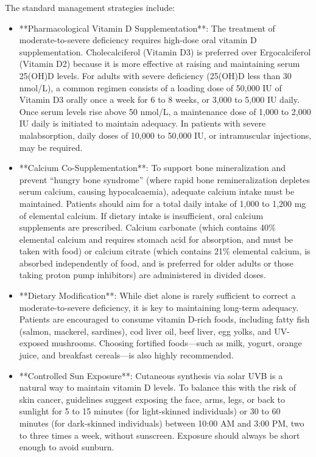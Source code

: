The standard management strategies include:
\begin{itemize}
    \item **Pharmacological Vitamin D Supplementation**: The treatment of moderate-to-severe deficiency requires high-dose oral vitamin D supplementation. Cholecalciferol (Vitamin D3) is preferred over Ergocalciferol (Vitamin D2) because it is more effective at raising and maintaining serum 25(OH)D levels. For adults with severe deficiency (25(OH)D less than 30 nmol/L), a common regimen consists of a loading dose of 50,000 IU of Vitamin D3 orally once a week for 6 to 8 weeks, or 3,000 to 5,000 IU daily. Once serum levels rise above 50 nmol/L, a maintenance dose of 1,000 to 2,000 IU daily is initiated to maintain adequacy. In patients with severe malabsorption, daily doses of 10,000 to 50,000 IU, or intramuscular injections, may be required.
    \item **Calcium Co-Supplementation**: To support bone mineralization and prevent ``hungry bone syndrome'' (where rapid bone remineralization depletes serum calcium, causing hypocalcaemia), adequate calcium intake must be maintained. Patients should aim for a total daily intake of 1,000 to 1,200 mg of elemental calcium. If dietary intake is insufficient, oral calcium supplements are prescribed. Calcium carbonate (which contains 40\% elemental calcium and requires stomach acid for absorption, and must be taken with food) or calcium citrate (which contains 21\% elemental calcium, is absorbed independently of food, and is preferred for older adults or those taking proton pump inhibitors) are administered in divided doses.
    \item **Dietary Modification**: While diet alone is rarely sufficient to correct a moderate-to-severe deficiency, it is key to maintaining long-term adequacy. Patients are encouraged to consume vitamin D-rich foods, including fatty fish (salmon, mackerel, sardines), cod liver oil, beef liver, egg yolks, and UV-exposed mushrooms. Choosing fortified foods—such as milk, yogurt, orange juice, and breakfast cereals—is also highly recommended.
    \item **Controlled Sun Exposure**: Cutaneous synthesis via solar UVB is a natural way to maintain vitamin D levels. To balance this with the risk of skin cancer, guidelines suggest exposing the face, arms, legs, or back to sunlight for 5 to 15 minutes (for light-skinned individuals) or 30 to 60 minutes (for dark-skinned individuals) between 10:00 AM and 3:00 PM, two to three times a week, without sunscreen. Exposure should always be short enough to avoid sunburn.

\end{itemize}
